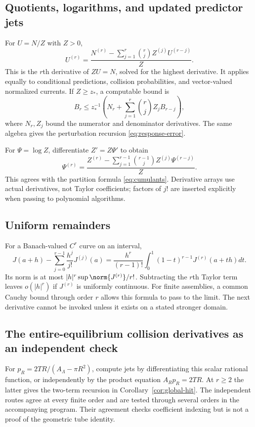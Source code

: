 \subsection{Quotients, logarithms, and updated predictor jets}
For $U=N/Z$ with $Z>0$,
\begin{equation}
 U^{(r)}=\frac{N^{(r)}-\sum_{j=1}^r\binom rjZ^{(j)}U^{(r-j)}}{Z}.
 \label{eq:quotient-jets}
\end{equation}
This is the $r$th derivative of $ZU=N$, solved for the highest derivative. It applies equally to conditional predictions, collision probabilities, and vector-valued normalized currents. If $Z\ge z_*$, a computable bound is
\[
 B_r\le z_*^{-1}\left(N_r+\sum_{j=1}^r\binom rj Z_jB_{r-j}\right),
\]
where $N_r,Z_j$ bound the numerator and denominator derivatives. The same algebra gives the perturbation recursion \eqref{eq:response-error}.

For $\Psi=\log Z$, differentiate $Z'=Z\Psi'$ to obtain
\[
 \Psi^{(r)}=
 \frac{Z^{(r)}-\sum_{j=1}^{r-1}\binom{r-1}{j}Z^{(j)}\Psi^{(r-j)}}Z.
\]
This agrees with the partition formula \eqref{eq:cumulants}. Derivative arrays use actual derivatives, not Taylor coefficients; factors of $j!$ are inserted explicitly when passing to polynomial algorithms.

\subsection{Uniform remainders}
For a Banach-valued $C^r$ curve on an interval,
\[
 J(a+h)-\sum_{j=0}^{r-1}\frac{h^j}{j!}J^{(j)}(a)
 =\frac{h^r}{(r-1)!}\int_0^1(1-t)^{r-1}J^{(r)}(a+th)dt.
\]
Its norm is at most $|h|^r\sup\norm{J^{(r)}}/r!$. Subtracting the $r$th Taylor term leaves $o(|h|^r)$ if $J^{(r)}$ is uniformly continuous. For finite assemblies, a common Cauchy bound through order $r$ allows this formula to pass to the limit. The next derivative cannot be invoked unless it exists on a stated stronger domain.

\subsection{The entire-equilibrium collision derivatives as an independent check}
For $p_R=2TR/(A_\Lambda-\pi R^2)$, compute jets by differentiating this scalar rational function, or independently by the product equation $A_Rp_R=2TR$. At $r\ge2$ the latter gives the two-term recursion in Corollary~\ref{cor:global-hit}. The independent routes agree at every finite order and are tested through several orders in the accompanying program. Their agreement checks coefficient indexing but is not a proof of the geometric tube identity.
\par
